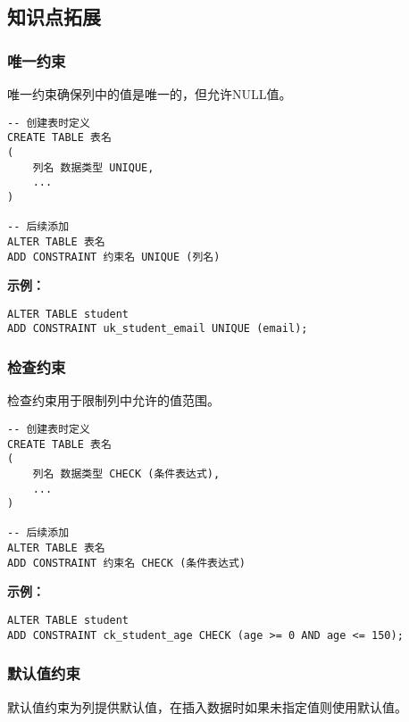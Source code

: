 \subsection{知识点拓展}

\subsubsection{唯一约束}

\qquad 唯一约束确保列中的值是唯一的，但允许NULL值。

\begin{mdframed}[backgroundcolor=gray!10]
\begin{verbatim}
-- 创建表时定义
CREATE TABLE 表名
(
    列名 数据类型 UNIQUE,
    ...
)

-- 后续添加
ALTER TABLE 表名
ADD CONSTRAINT 约束名 UNIQUE (列名)
\end{verbatim}
\end{mdframed}

\textbf{示例：}
\begin{verbatim}
ALTER TABLE student
ADD CONSTRAINT uk_student_email UNIQUE (email);
\end{verbatim}

\subsubsection{检查约束}

\qquad 检查约束用于限制列中允许的值范围。

\begin{mdframed}[backgroundcolor=gray!10]
\begin{verbatim}
-- 创建表时定义
CREATE TABLE 表名
(
    列名 数据类型 CHECK (条件表达式),
    ...
)

-- 后续添加
ALTER TABLE 表名
ADD CONSTRAINT 约束名 CHECK (条件表达式)
\end{verbatim}
\end{mdframed}

\textbf{示例：}
\begin{verbatim}
ALTER TABLE student
ADD CONSTRAINT ck_student_age CHECK (age >= 0 AND age <= 150);
\end{verbatim}

\subsubsection{默认值约束}

\qquad 默认值约束为列提供默认值，在插入数据时如果未指定值则使用默认值。

